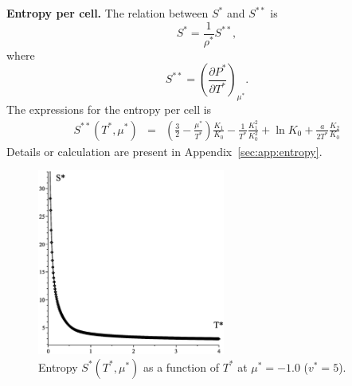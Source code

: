 \documentclass[12pt]{article}
\numberwithin{equation}{section}
\begin{document}
	
	\textbf{Entropy per cell.} The relation between $S^*$ and $S^{**}$ is
	\begin{equation}
		S^* = \frac{1}{\rho^*} S^{**},
	\end{equation}
	where
	\begin{equation}
		\label{eq:entropy2}
		S^{**}  = \left(\frac{\partial P^*}{\partial T^*}\right)_{\mu^*}.
	\end{equation}
	The expressions for the entropy per cell is
	\begin{eqnarray}
		S^{**}(T^*,\mu^*) & = & \left(\frac{3}{2} - \frac{\mu^*}{T^*}\right)\frac{K_1}{K_0} - \frac{1}{T^*}\frac{K_1^2}{K_0^2} + \ln K_0 + \frac{a}{2T^*} \frac{K_2}{K_0}
	\end{eqnarray}
	Details or calculation are present in Appendix~\ref{sec:app:entropy}.
	
	\begin{figure}[htbp]
		\includegraphics[width=0.55\textwidth,angle=0]{S_vs_T1}
		\centering
		\captionsetup{width=0.5\textwidth}
		{\caption{\label{fig:S_vs_T1} Entropy $S^{*}(T^*,\mu^*)$ as a function of $T^*$ at $\mu^*=-1.0$ ($v^* = 5$).}}
	\end{figure}
	
\end{document}
